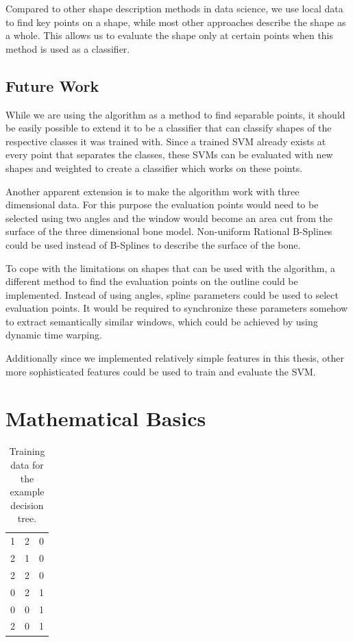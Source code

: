 \documentclass[pdftex,12pt,a4paper]{report}
\begin{document}
Compared to other shape description methods in data science, we use local data to find key points on a shape, while most other approaches describe the shape as a whole. This allows us to evaluate the shape only at certain points when this method is used as a classifier.

\section{Future Work}

While we are using the algorithm as a method to find separable points, it should be easily possible to extend it to be a classifier that can classify shapes of the respective classes it was trained with. Since a trained SVM already exists at every point that separates the classes, these SVMs can be evaluated with new shapes and weighted to create a classifier which works on these points.

Another apparent extension is to make the algorithm work with three dimensional data. For this purpose the evaluation points would need to be selected using two angles and the window would become an area cut from the surface of the three dimensional bone model. Non-uniform Rational B-Splines could be used instead of B-Splines to describe the surface of the bone.

To cope with the limitations on shapes that can be used with the algorithm, a different method to find the evaluation points on the outline could be implemented. Instead of using angles, spline parameters could be used to select evaluation points. It would be required to synchronize these parameters somehow to extract semantically similar windows, which could be achieved by using dynamic time warping.

Additionally since we implemented relatively simple features in this thesis, other more sophisticated features could be used to train and evaluate the SVM.

\appendix

\chapter{Mathematical Basics}

\begin{table}[h]
	\begin{center}
		\begin{tabular}{|r|r|r|}
			\hline
			\makebox[1cm]{$f_1$} & \makebox[1cm]{$f_2$} & \makebox[1cm]{$c$} \\
			\hline
			\hline 1 & 2 & 0 \\
			\hline 2 & 1 & 0 \\
			\hline 2 & 2 & 0 \\
			\hline 0 & 2 & 1 \\
			\hline 0 & 0 & 1 \\
			\hline 2 & 0 & 1 \\
			\hline
		\end{tabular}
	\end{center}
	\caption{Training data for the example decision tree.}
	\label{appendix:table:decision-tree}
\end{table}
\end{document}
